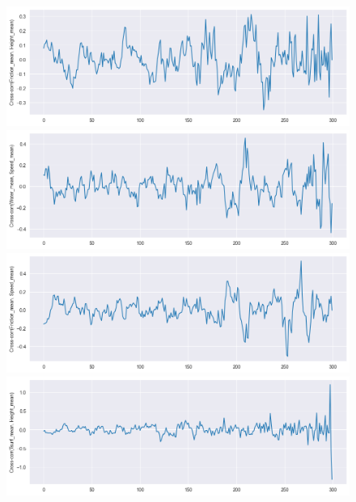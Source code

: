\documentclass[12pt, bachelor, substylefile = algo_title.rtx]{disser}
\theoremstyle{definition}
\begin{document}
\begin{figure}[!h]
   \begin{minipage}{.48\textwidth}
     \includegraphics[width=\linewidth]{ccf1}
   \end{minipage} \hfill
\begin{minipage}{.48\textwidth}
     \includegraphics[width=\linewidth]{ccf4}
   \end{minipage}
   \begin{minipage}{.48\textwidth}
     \includegraphics[width=\linewidth]{ccf2}
   \end{minipage} \hfill
\begin{minipage}{.48\textwidth}
     \includegraphics[width=\linewidth]{ccf5}

\end{minipage}
\end{figure}
\end{document}
